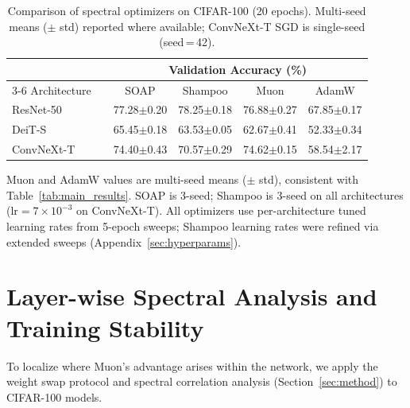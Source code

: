 \begin{table}[h]
\centering
\caption{Comparison of spectral optimizers on CIFAR-100 (20 epochs). Multi-seed means ($\pm$ std) reported where available; ConvNeXt-T SGD is single-seed (seed\,=\,42).}
\label{tab:spectral_comparison}
\small
\begin{tabular}{llcccc}
\toprule
 & & \multicolumn{4}{c}{Validation Accuracy (\%)} \\
\cmidrule(lr){3-6}
Architecture & & SOAP & Shampoo & Muon & AdamW \\
\midrule
ResNet-50  & & 77.28{\scriptsize$\pm$0.20} & 78.25{\scriptsize$\pm$0.18} & 76.88{\scriptsize$\pm$0.27} & 67.85{\scriptsize$\pm$0.17} \\
DeiT-S     & & 65.45{\scriptsize$\pm$0.18} & 63.53{\scriptsize$\pm$0.05} & 62.67{\scriptsize$\pm$0.41} & 52.33{\scriptsize$\pm$0.34} \\
ConvNeXt-T & & 74.40{\scriptsize$\pm$0.43} & 70.57{\scriptsize$\pm$0.29} & 74.62{\scriptsize$\pm$0.15} & 58.54{\scriptsize$\pm$2.17} \\
\bottomrule
\end{tabular}
\vspace{0.3em}
\par\noindent\footnotesize{Muon and AdamW values are multi-seed means ($\pm$ std), consistent with Table~\ref{tab:main_results}. SOAP is 3-seed; Shampoo is 3-seed on all architectures ($\text{lr}{=}7{\times}10^{-3}$ on ConvNeXt-T). All optimizers use per-architecture tuned learning rates from 5-epoch sweeps; Shampoo learning rates were refined via extended sweeps (Appendix~\ref{sec:hyperparams}).}
\end{table}

\section{Layer-wise Spectral Analysis and Training Stability}\label{sec:spectral_analysis_full}

To localize where Muon's advantage arises within the network, we apply the weight swap protocol and spectral correlation analysis (Section~\ref{sec:method}) to CIFAR-100 models.

